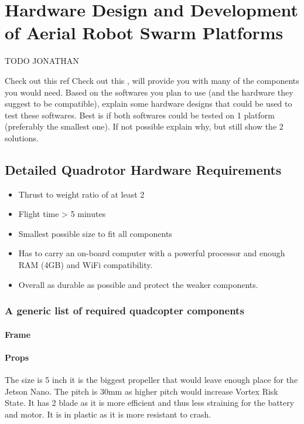 \chapter{Hardware Design and Development of Aerial Robot Swarm Platforms}
 {\color{red}TODO JONATHAN}

Check out this ref
    {\color{red} Check out this \cite{dojofordrones_rpi_drone}, will provide you with many of the components you would need.}
Based on the softwares you plan to use (and the hardware they suggest to be compatible), explain some hardware designs that could be used to test these softwares. Best is if both softwares could be tested on 1 platform (preferably the smallest one). If not possible explain why, but still show the 2 solutions.

\section{Detailed Quadrotor Hardware Requirements}
\begin{itemize}
    \item Thrust to weight ratio of at least 2
    \item Flight time > 5 minutes
    \item Smallest possible size to fit all components
    \item Has to carry an on-board computer with a powerful processor and enough RAM (4GB) and WiFi compatibility.
    \item Overall as durable as possible and protect the weaker components.
\end{itemize}

\subsection{A generic list of required quadcopter components}

\subsubsection{Frame}

\subsubsection{Props}
The size is 5 inch it is the biggest propeller that would leave enough place for the Jetson Nano. The pitch is 30mm as higher pitch would increase Vortex Risk State. It has 2 blade as it is more efficient and thus less straining for the battery and motor. It is in plastic as it is more resistant to crash.


